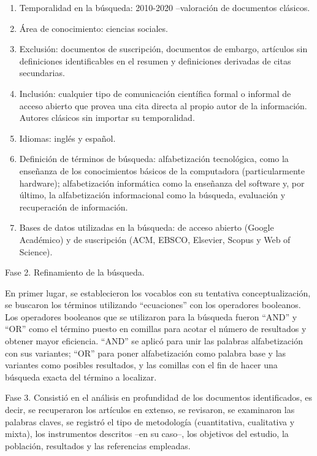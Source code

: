 \documentclass{textolivre}
\begin{document}
\begin{enumerate}[label={\alph*}]
    \item Temporalidad en la búsqueda: 2010-2020 –valoración de documentos clásicos.
    \item Área de conocimiento: ciencias sociales.
    \item Exclusión: documentos de suscripción, documentos de embargo, artículos sin definiciones identificables en el resumen y definiciones derivadas de citas secundarias.
    \item Inclusión: cualquier tipo de comunicación científica formal o informal de acceso abierto que provea una cita directa al propio autor de la información. Autores clásicos sin importar su temporalidad.
    \item Idiomas: inglés y español.
    \item Definición de términos de búsqueda: alfabetización tecnológica, como la enseñanza de los conocimientos básicos de la computadora (particularmente hardware); alfabetización informática como la enseñanza del software y, por último, la alfabetización informacional como la búsqueda, evaluación y recuperación de información. 
    \item Bases de datos utilizadas en la búsqueda: de acceso abierto (Google Académico) y de suscripción (ACM, EBSCO, Elsevier, Scopus y Web of Science). 
\end{enumerate}

Fase 2. Refinamiento de la búsqueda.

En primer lugar, se establecieron los vocablos con su tentativa conceptualización, se buscaron los términos utilizando “ecuaciones” con los operadores booleanos. Los operadores booleanos que se utilizaron para la búsqueda fueron “AND” y “OR” como el término puesto en comillas para acotar el número de resultados y obtener mayor eficiencia. “AND” se aplicó para unir las palabras alfabetización con sus variantes; “OR” para poner alfabetización como palabra base y las variantes como posibles resultados, y las comillas con el fin de hacer una búsqueda exacta del término a localizar.

Fase 3. Consistió en el análisis en profundidad de los documentos identificados, es decir, se recuperaron los artículos en extenso, se revisaron, se examinaron las palabras claves, se registró el tipo de metodología (cuantitativa, cualitativa y mixta), los instrumentos descritos –en su caso–, los objetivos del estudio, la población, resultados y las referencias empleadas.
\end{document}
